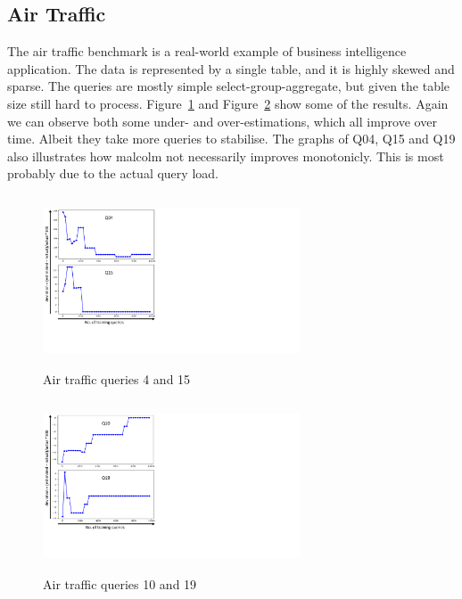 \documentclass[conference]{IEEEtran}
\begin{document}
\subsection{Air Traffic}
The air traffic benchmark is a real-world example of business intelligence application.
The data is represented by a single table, and it is highly skewed and sparse.
The queries are mostly simple select-group-aggregate, but given the table size still hard to process.
Figure~\ref{fig:airtraffic-q4-q15} and Figure~\ref{fig:airtraffic-q10-q19} show some of the results.
Again we can observe both some under- and over-estimations, which all improve over time.
Albeit they take more queries to stabilise.
The graphs of Q04, Q15 and Q19 also illustrates how {\sc malcolm} not necessarily improves monotonicly.
This is most probably due to the actual query load.

\begin{figure}[t!]
	\centering
	\includegraphics[height=2in,width=3in]{Figures/airtraffic-q4-q15.pdf}
	\caption{Air traffic queries 4 and 15
		\label{fig:airtraffic-q4-q15}}
\end{figure}

\begin{figure}[t!]
	\centering
	\includegraphics[height=2in,width=3in]{Figures/airtraffic-q10-q19.pdf}
	\caption{Air traffic queries 10 and 19
		\label{fig:airtraffic-q10-q19}}
\end{figure}
\end{document}
